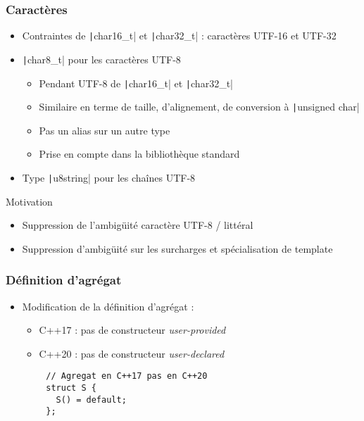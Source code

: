 \documentclass[C++.tex]{subfiles}
\begin{document}
\begin{frame}[fragile]
	\frametitle{Caractères}
	\begin{itemize}
		\item Contraintes de \texttt|char16_t| et \texttt|char32_t| : caractères UTF-16 et UTF-32


		\item \texttt|char8_t| pour les caractères UTF-8
		\begin{itemize}
			\item Pendant UTF-8 de \texttt|char16_t| et \texttt|char32_t|
			\item Similaire en terme de taille, d'alignement, de conversion à \texttt|unsigned char|
			\item Pas un alias sur un autre type
			\item Prise en compte dans la bibliothèque standard
		\end{itemize}
		\item Type \texttt|u8string| pour les chaînes UTF-8
	\end{itemize}

	\begin{block}{Motivation}
		\begin{itemize}
			\item Suppression de l'ambigüité caractère UTF-8 / littéral


			\item Suppression d'ambigüité sur les surcharges et spécialisation de template
		\end{itemize}
	\end{block}
\end{frame}

\begin{frame}[fragile]
	\frametitle{Définition d'agrégat}
	\begin{itemize}
		\item Modification de la définition d'agrégat :
		\begin{itemize}
			\item C++17 : pas de constructeur \textit{user-provided}
			\item C++20 : pas de constructeur \textit{user-declared}

		\end{itemize}
	\end{itemize}

	\begin{verbatim}
		// Agregat en C++17 pas en C++20
		struct S {
		  S() = default;
		};
	\end{verbatim}
\end{frame}
\end{document}
